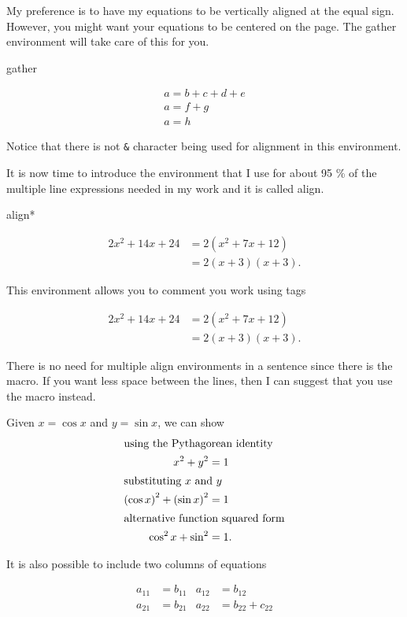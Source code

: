 My preference is to have my equations to be vertically aligned at the equal sign.
However, you might want your equations to be centered on the page.  The gather 
environment will take care of this for you.
\begin{docEnvironment*}[doclang/environment content=mathematics content goes here]{gather}{}{}
  \begin{dispExample}
    \begin{gather*}
        a = b + c + d + e \\
        a = f + g \\
        a = h
    \end{gather*}
    \end{dispExample}
  Notice that there is not \verb!&! character being used for alignment in this environment.
\end{docEnvironment*}
It is now time to introduce the environment that I use for about 95 \% of the 
multiple line expressions needed in my work and it is called align.  
\begin{docEnvironment*}[doclang/environment content=mathematics content goes here]{align*}{}{}
\begin{dispExample}
  \begin{align*}
    2x^2 + 14x + 24 
    &= 2( x^2 + 7x + 12 ) \\
    &= 2(x + 3)(x + 3). 
  \end{align*}
\end{dispExample}
This environment allows you to comment you work using tags
\begin{dispExample}
  \begin{align*}
    2x^2 + 14x + 24 
    &= 2( x^2 + 7x + 12 ) \tag{factoring two}\\
    &= 2(x + 3)(x + 3). \tag{factoring the quadratic}
  \end{align*}
\end{dispExample}
There is no need for multiple align environments in a 
sentence since there is the  macro.  If 
you want less space between the lines, then I can
suggest that you use the  macro instead.
\begin{dispExample}
  Given \( x = \cos x \) and \( y = \sin x \), we can show
  \begin{align*}
    \shortintertext{using the Pythagorean identity}
    x^2 + y^2 &= 1 \\
    \intertext{substituting \(x \) and \(y \)}
    \left( \cos x \right)^2 + \left( \sin x \right)^2 &= 1 \\
    \shortintertext{alternative function squared form}
    \cos^2 x + \sin^2 &= 1.
  \end{align*}
\end{dispExample}
It is also possible to include two columns of equations
  \begin{dispExample}
  \begin{align*}
    a_{11}
    & =b_{11}
    &
    a_{12}
    & =b_{12}\\
    a_{21}
    & =b_{21}
    &
    a_{22}
    & =b_{22}+c_{22}
\end{align*}
\end{dispExample}
\end{docEnvironment*}
